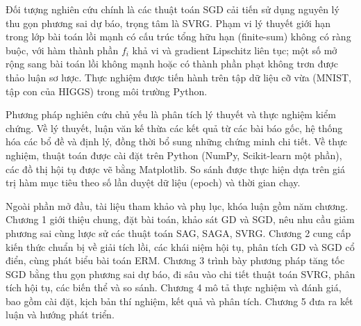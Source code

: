 Đối tượng nghiên cứu chính là các thuật toán SGD cải tiến sử dụng nguyên lý thu gọn phương sai dự báo, trọng tâm là SVRG. Phạm vi lý thuyết giới hạn trong lớp bài toán lồi mạnh có cấu trúc tổng hữu hạn (finite-sum) không có ràng buộc, với hàm thành phần $f_i$ khả vi và gradient Lipschitz liên tục; một số mở rộng sang bài toán lồi không mạnh hoặc có thành phần phạt không trơn được thảo luận sơ lược. Thực nghiệm được tiến hành trên tập dữ liệu cỡ vừa (MNIST, tập con của HIGGS) trong môi trường Python.

Phương pháp nghiên cứu chủ yếu là phân tích lý thuyết và thực nghiệm kiểm chứng. Về lý thuyết, luận văn kế thừa các kết quả từ các bài báo gốc, hệ thống hóa các bổ đề và định lý, đồng thời bổ sung những chứng minh chi tiết. Về thực nghiệm, thuật toán được cài đặt trên Python (NumPy, Scikit-learn một phần), các đồ thị hội tụ được vẽ bằng Matplotlib. So sánh được thực hiện dựa trên giá trị hàm mục tiêu theo số lần duyệt dữ liệu (epoch) và thời gian chạy.

Ngoài phần mở đầu, tài liệu tham khảo và phụ lục, khóa luận gồm năm chương. Chương 1 giới thiệu chung, đặt bài toán, khảo sát GD và SGD, nêu nhu cầu giảm phương sai cùng lược sử các thuật toán SAG, SAGA, SVRG. Chương 2 cung cấp kiến thức chuẩn bị về giải tích lồi, các khái niệm hội tụ, phân tích GD và SGD cổ điển, cùng phát biểu bài toán ERM. Chương 3 trình bày phương pháp tăng tốc SGD bằng thu gọn phương sai dự báo, đi sâu vào chi tiết thuật toán SVRG, phân tích hội tụ, các biến thể và so sánh. Chương 4 mô tả thực nghiệm và đánh giá, bao gồm cài đặt, kịch bản thí nghiệm, kết quả và phân tích. Chương 5 đưa ra kết luận và hướng phát triển.